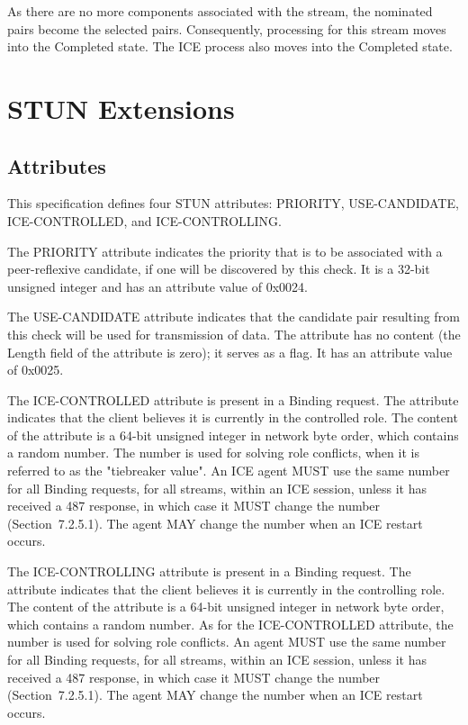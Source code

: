 \documentclass{article}
\begin{document}
As there are no more components associated with the stream, the nominated pairs become the selected pairs.  Consequently, processing for this stream moves into the Completed state.  The ICE process also moves into the Completed state.

\section{STUN Extensions}

\subsection{Attributes}

This specification defines four STUN attributes: PRIORITY, USE-CANDIDATE, ICE-CONTROLLED, and ICE-CONTROLLING.

The PRIORITY attribute indicates the priority that is to be associated with a peer-reflexive candidate, if one will be discovered by this check.  It is a 32-bit unsigned integer and has an attribute value of 0x0024.

The USE-CANDIDATE attribute indicates that the candidate pair resulting from this check will be used for transmission of data.  The attribute has no content (the Length field of the attribute is zero); it serves as a flag.  It has an attribute value of 0x0025.

The ICE-CONTROLLED attribute is present in a Binding request.  The attribute indicates that the client believes it is currently in the controlled role.  The content of the attribute is a 64-bit unsigned integer in network byte order, which contains a random number.  The number is used for solving role conflicts, when it is referred to as the "tiebreaker value".  An ICE agent MUST use the same number for all Binding requests, for all streams, within an ICE session, unless it has received a 487 response, in which case it MUST change the number (Section~7.2.5.1).  The agent MAY change the number when an ICE restart occurs.

The ICE-CONTROLLING attribute is present in a Binding request.  The attribute indicates that the client believes it is currently in the controlling role.  The content of the attribute is a 64-bit unsigned integer in network byte order, which contains a random number.  As for the ICE-CONTROLLED attribute, the number is used for solving role conflicts.  An agent MUST use the same number for all Binding requests, for all streams, within an ICE session, unless it has received a 487 response, in which case it MUST change the number (Section~7.2.5.1).  The agent MAY change the number when an ICE restart occurs.
\end{document}
